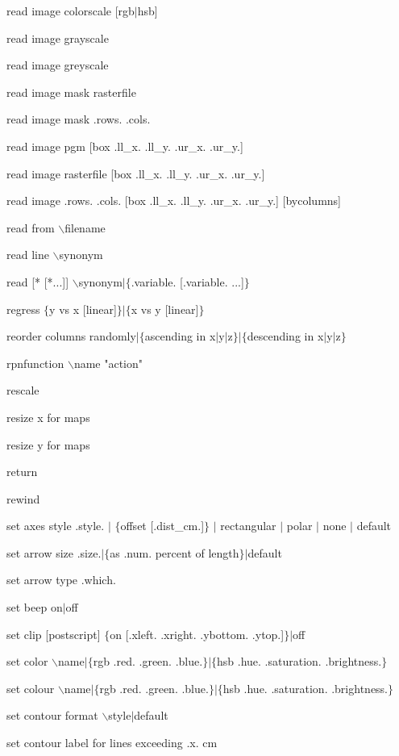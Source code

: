 read image colorscale [rgb$\mid$hsb]

read image grayscale

read image greyscale

read image mask rasterfile

read image mask .rows. .cols.

read image pgm [box .ll\_x. .ll\_y. .ur\_x. .ur\_y.]

read image rasterfile [box .ll\_x. .ll\_y. .ur\_x. .ur\_y.]

read image .rows. .cols. [box .ll\_x. .ll\_y. .ur\_x. .ur\_y.] [bycolumns]

read from $\backslash$filename

read line $\backslash$synonym

read [* [*...]] $\backslash$synonym$\mid$$\lbrace$.variable. [.variable. ...]$\rbrace$

regress $\lbrace$y vs x [linear]$\rbrace$$\mid$$\lbrace$x vs y [linear]$\rbrace$

reorder columns randomly$\mid$$\lbrace$ascending in x$\mid$y$\mid$z$\rbrace$$\mid$$\lbrace$descending in x$\mid$y$\mid$z$\rbrace$

rpnfunction $\backslash$name "action"

rescale

resize x for maps

resize y for maps

return

rewind

set axes style .style. $\mid$ $\lbrace$offset [.dist\_cm.]$\rbrace$ $\mid$ rectangular $\mid$ polar $\mid$ none $\mid$ default

set arrow size .size.$\mid$$\lbrace$as .num. percent of length$\rbrace$$\mid$default

set arrow type .which.

set beep on$\mid$off

set clip [postscript] $\lbrace$on [.xleft. .xright. .ybottom. .ytop.]$\rbrace$$\mid$off

set color $\backslash$name$\mid$$\lbrace$rgb .red. .green. .blue.$\rbrace$$\mid$$\lbrace$hsb .hue. .saturation. .brightness.$\rbrace$

set colour $\backslash$name$\mid$$\lbrace$rgb .red. .green. .blue.$\rbrace$$\mid$$\lbrace$hsb .hue. .saturation. .brightness.$\rbrace$

set contour format $\backslash$style$\mid$default

set contour label for lines exceeding .x. cm

